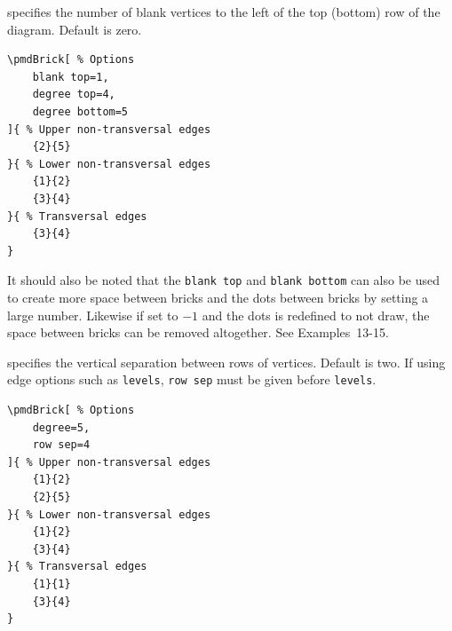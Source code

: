 \documentclass{ltxdoc}
\begin{document}
 
specifies the number of blank vertices to the left of the top (bottom) row of the diagram. Default is zero.
\begin{center}
    \begin{minipage}{\dimexpr0.85\textwidth-2\fboxrule-2\fboxsep\relax}
        \begin{minipage}[c]{0.4\linewidth}
\begin{verbatim}
\pmdBrick[ % Options
    blank top=1,
    degree top=4,
    degree bottom=5
]{ % Upper non-transversal edges
    {2}{5}
}{ % Lower non-transversal edges
    {1}{2}
    {3}{4}
}{ % Transversal edges
    {3}{4}
}
\end{verbatim}
        \end{minipage}
        \hfill
        \begin{minipage}[c]{0.4\linewidth}
        \end{minipage}
    \end{minipage}%
\end{center}

It should also be noted that the \texttt{blank top} and \texttt{blank bottom} can also be used to create more space between bricks and the dots between bricks by setting a large number. Likewise if set to \( -1 \) and the dots is redefined to not draw, the space between bricks can be removed altogether. See Examples~13-15.

specifies the vertical separation between rows of vertices. Default is two. If using edge options such as \texttt{levels}, \texttt{row sep} must be given before \texttt{levels}.
\begin{center}
    \begin{minipage}{\dimexpr0.85\textwidth-2\fboxrule-2\fboxsep\relax}
        \begin{minipage}[c]{0.4\linewidth}
\begin{verbatim}
\pmdBrick[ % Options
    degree=5,
    row sep=4
]{ % Upper non-transversal edges
    {1}{2}
    {2}{5}
}{ % Lower non-transversal edges
    {1}{2}
    {3}{4}
}{ % Transversal edges
    {1}{1}
    {3}{4}
}
\end{verbatim}
        \end{minipage}
        \hfill
        \begin{minipage}[c]{0.4\linewidth}
        \end{minipage}
    \end{minipage}%
\end{center}
\end{document}
